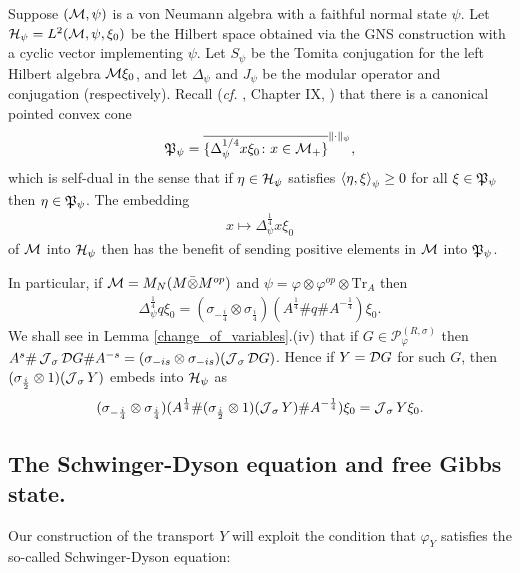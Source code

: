 Suppose $(\mathcal M,\psi)$ is a von Neumann algebra with a faithful normal state $\psi$. Let $\mathcal H_\psi=L^2(\mathcal M,\psi,\xi_0)$ be the Hilbert space obtained via the GNS construction with a cyclic vector implementing $\psi$. Let $S_\psi$ be the Tomita conjugation for the left Hilbert algebra $\mathcal M\xi_0$, and let $\Delta_\psi$ and $J_\psi$ be the modular operator and conjugation (respectively). Recall (\emph{cf.} \cite{Tak03}, Chapter IX, ) that there is a canonical pointed convex cone
	\begin{align*}
		\mathfrak{P}_\psi=\overline{\{ \Delta_\psi^{1/4}x\xi_0\colon x\in\mathcal M_+\}}^{\|\cdot\|_{\psi}},
	\end{align*}
which is self-dual in the sense that if $\eta\in\mathcal H_\psi$ satisfies $\left\langle\eta,\xi\right\rangle_\psi\geq 0$ for all $\xi\in \mathfrak{P}_\psi$ then $\eta\in \mathfrak{P}_\psi$. The embedding
	\begin{align*}
		x\mapsto \Delta_\psi^\frac{1}{4} x \xi_0
	\end{align*}
of $\mathcal M$ into $\mathcal H_\psi$ then has the benefit of sending positive elements in $\mathcal M$ into $\mathfrak{P}_\psi$.\par
In particular, if $\mathcal M=M_N(M\bar{\otimes} M^{op})$ and $\psi=\varphi\otimes\varphi^{op}\otimes \text{Tr}_A$ then
	\begin{align*}
		\Delta_\psi^\frac{1}{4} q \xi_0= (\sigma_{-\frac{i}{4}}\otimes \sigma_\frac{i}{4})(A^\frac{1}{4}\# q\# A^{-\frac{1}{4}})\xi_0.
	\end{align*}
We shall see in Lemma \ref{change_of_variables}.(iv) that if $G\in \mathscr{P}_\varphi^{(R,\sigma)}$ then $A^s\#\operatorname{\mathcal J}_\sigma \mathcal D G \# A^{-s}=(\sigma_{-is}\otimes\sigma_{-is})(\operatorname{\mathcal J}_\sigma \mathcal D G)$. Hence if $Y=\mathcal D G$ for such $G$, then $(\sigma_\frac{i}{2}\otimes 1)(\operatorname{\mathcal J}_\sigma Y)$ embeds into $\mathcal H_\psi$ as
	\begin{align*}
		(\sigma_{-\frac{i}{4}}\otimes \sigma_\frac{i}{4})(A^\frac{1}{4}\# (\sigma_\frac{i}{2}\otimes 1)(\operatorname{\mathcal J}_\sigma Y)\# A^{-\frac{1}{4}})\xi_0 = \operatorname{\mathcal J}_\sigma Y \xi_0.
	\end{align*}




\subsection{The Schwinger-Dyson equation and free Gibbs state.}\label{S-D_section}
Our construction of the transport $Y$ will exploit the condition that $\varphi_Y$ satisfies the so-called Schwinger-Dyson equation:

